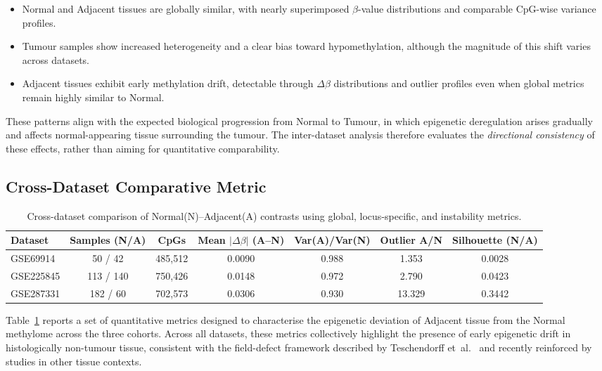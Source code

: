 \documentclass[10pt]{extarticle}
\begin{document}
\begin{itemize}[label=-]
    \item Normal and Adjacent tissues are globally similar, with nearly superimposed $\beta$-value distributions and
    comparable CpG-wise variance profiles.
    \item Tumour samples show increased heterogeneity and a clear bias toward hypomethylation, although the magnitude
    of this shift varies across datasets.
    \item Adjacent tissues exhibit early methylation drift, detectable through $\Delta\beta$ distributions and outlier 
    profiles even when global metrics remain highly similar to Normal.
\end{itemize}

These patterns align with the expected biological progression from Normal to Tumour, in which epigenetic 
deregulation arises gradually and affects normal-appearing tissue surrounding the tumour.  
The inter-dataset analysis therefore evaluates the \textit{directional consistency} of these effects, rather than aiming 
for quantitative comparability.

\subsection{Cross-Dataset Comparative Metric}

\begin{table}[t]
\centering
\caption{Cross-dataset comparison of Normal(N)--Adjacent(A) contrasts using global, locus-specific, and instability metrics.}
\label{tab:inter_summary_NA}
\scriptsize
\begin{tabular}{lcccccc}
\toprule
\textbf{Dataset} &
\textbf{Samples (N/A)} &
\textbf{CpGs} &
\textbf{Mean $|\Delta\beta|$ (A--N)} &
\textbf{Var(A)/Var(N)} &
\textbf{Outlier A/N} &
\textbf{Silhouette (N/A)} \\
\midrule
GSE69914 &
50 / 42 &
485{,}512 &
0.0090 &
0.988 &
1.353 &
0.0028 \\
GSE225845 &
113 / 140 &
750{,}426 &
0.0148 &
0.972 &
2.790 &
0.0423 \\
GSE287331 &
182 / 60 &
702{,}573 &
0.0306 &
0.930 &
13.329 &
0.3442 \\
\bottomrule
\end{tabular}
\end{table}

Table~\ref{tab:inter_summary_NA} reports a set of quantitative metrics designed to characterise 
the epigenetic deviation of Adjacent tissue from the Normal methylome across the three cohorts.  
Across all datasets, these metrics collectively highlight the presence of early epigenetic drift 
in histologically non-tumour tissue, consistent with the field-defect framework described by 
Teschendorff et~al.~\cite{teschendorff2016} and recently reinforced by studies in other 
tissue contexts.
\end{document}
